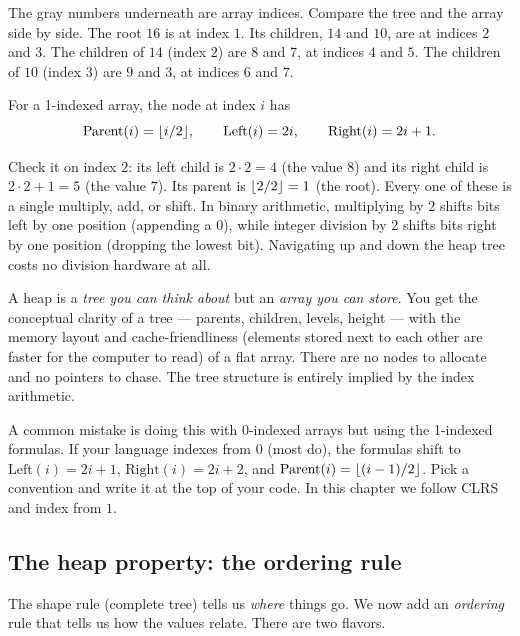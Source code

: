 The gray numbers underneath are array indices. Compare the tree and the array
side by side. The root $16$ is at index $1$. Its children, $14$ and $10$, are at
indices $2$ and $3$. The children of $14$ (index $2$) are $8$ and $7$, at indices
$4$ and $5$. The children of $10$ (index $3$) are $9$ and $3$, at indices $6$ and
$7$.

\begin{focusbox}
For a 1-indexed array, the node at index $i$ has
\[
  \mathrm{Parent}(i) = \lfloor i/2\rfloor, \qquad
  \mathrm{Left}(i) = 2i, \qquad
  \mathrm{Right}(i) = 2i + 1.
\]
\end{focusbox}

Check it on index $2$: its left child is $2\cdot 2 = 4$ (the value $8$) and its
right child is $2\cdot 2 + 1 = 5$ (the value $7$). Its parent is
$\lfloor2/2\rfloor = 1$ (the root). Every one of these is a single multiply, add, or
shift. In binary arithmetic, multiplying by $2$ shifts bits left by one position
(appending a $0$), while integer division by $2$ shifts bits right by one position
(dropping the lowest bit). Navigating up and down the heap tree costs no division
hardware at all.

\begin{intuitionbox}
A heap is a \emph{tree you can think about} but an \emph{array you can store}.
You get the conceptual clarity of a tree --- parents, children, levels, height
--- with the memory layout and cache-friendliness (elements stored next to each other are faster for the computer to read) of a flat array. There are no
nodes to allocate and no pointers to chase. The tree structure is
entirely implied by the index arithmetic.
\end{intuitionbox}

\begin{trapbox}
A common mistake is doing this with 0-indexed arrays but using the
1-indexed formulas. If your language indexes from $0$ (most do), the formulas
shift to $\mathrm{Left}(i) = 2i + 1$, $\mathrm{Right}(i) = 2i + 2$, and
$\mathrm{Parent}(i) = \lfloor(i-1)/2\rfloor$. Pick a convention and write it at
the top of your code. In this chapter we follow CLRS and index from $1$.
\end{trapbox}

\subsection{The heap property: the ordering rule}

The shape rule (complete tree) tells us \emph{where} things go. We now add an
\emph{ordering} rule that tells us how the values relate. There are two flavors.

